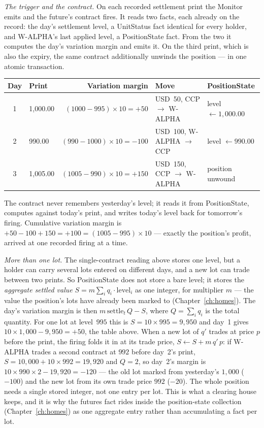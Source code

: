 \documentclass[11pt,a4paper]{article}
\newcommand{\USD}[1]{\mbox{USD~#1}}
\begin{document}
\emph{The trigger and the contract.} On each recorded settlement print the
Monitor emits and the future's contract fires. It reads two facts, each already
on the record: the day's settlement level, a UnitStatus fact identical for every
holder, and W-ALPHA's last applied level, a PositionState fact. From the two it
computes the day's variation margin and emits it. On the third print, which is
also the expiry, the same contract additionally unwinds the position --- in one
atomic transaction.

\begin{center}
\small
\begin{tabular}{clrll}
\toprule
Day & Print & Variation margin & Move & PositionState \\
\midrule
1 & 1{,}000.00 & $(1000-995)\times 10 = +50$   & \USD{50}, CCP $\rightarrow$ W-ALPHA  & level $\leftarrow 1{,}000.00$ \\
2 & \phantom{0}990.00 & $(990-1000)\times 10 = -100$ & \USD{100}, W-ALPHA $\rightarrow$ CCP & level $\leftarrow 990.00$ \\
3 & 1{,}005.00 & $(1005-990)\times 10 = +150$  & \USD{150}, CCP $\rightarrow$ W-ALPHA & position unwound \\
\bottomrule
\end{tabular}
\end{center}

The contract never remembers yesterday's level; it reads it from PositionState,
computes against today's print, and writes today's level back for tomorrow's
firing. Cumulative variation margin is $+50-100+150 = +100 = (1005-995)\times 10$
--- exactly the position's profit, arrived at one recorded firing at a time.

\emph{More than one lot.} The single-contract reading above stores one level, but a holder
can carry several lots entered on different days, and a new lot can trade between two prints.
So PositionState does not store a bare level; it stores the \emph{aggregate settled value}
$S = m\sum_i q_i\cdot\text{level}_i$ as one integer, for multiplier $m$ --- the value the
position's lots have already been marked to (Chapter~\ref{ch:homes}). The day's variation
margin is then $m\,\text{settle}_t\,Q - S$, where $Q=\sum_i q_i$ is the total quantity. For
one lot at level~$995$ this is $S = 10\times 995 = 9{,}950$ and day~1 gives
$10\times 1{,}000 - 9{,}950 = +50$, the table above. When a new lot of $q'$ trades at price
$p$ before the print, the firing folds it in at its trade price, $S \leftarrow S + m\,q'\,p$:
if W-ALPHA trades a second contract at $992$ before day~2's print, $S = 10{,}000 + 10\times
992 = 19{,}920$ and $Q=2$, so day~2's margin is $10\times 990\times 2 - 19{,}920 = -120$ ---
the old lot marked from yesterday's $1{,}000$ ($-100$) and the new lot from its own trade
price $992$ ($-20$). The whole position needs a single stored integer, not one entry per lot.
This is what a clearing house keeps, and it is why the futures fact rides inside the
position-state collection (Chapter~\ref{ch:homes}) as one aggregate entry rather than
accumulating a fact per lot.
\end{document}
